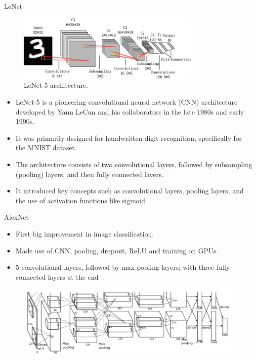 \begin{frame}{LeNet}
\begin{figure}
\centering
\includegraphics[width=0.8\textwidth,height=0.4\textheight,keepaspectratio]{images/cnn/lenet5.png}
\caption{LeNet-5 architecture.}
\end{figure}
{\small
\begin{itemize}
    \item LeNet-5 is a pioneering convolutional neural network (CNN) architecture developed by Yann LeCun and his collaborators in the late 1980s and early 1990s.
    \item It was primarily designed for handwritten digit recognition, specifically for the MNIST dataset.
    \item The architecture consists of two convolutional layers, followed by subsampling (pooling) layers, and then fully connected layers.
    \item It introduced key concepts such as convolutional layers, pooling layers, and the use of activation functions like sigmoid
\end{itemize}
}
\end{frame}

\begin{frame}{AlexNet}
\begin{itemize}
    \item First big improvement in image classification.
    \item Made use of CNN, pooling, dropout, ReLU and training on GPUs.
    \item 5 convolutional layers, followed by max-pooling layers; with three fully connected layers at the end

\end{itemize}

\begin{figure}
\centering
\includegraphics[width=1.0\textwidth,height=0.5\textheight,keepaspectratio]{images/cnn/alexnet.png}
\end{figure}
    
\end{frame}

